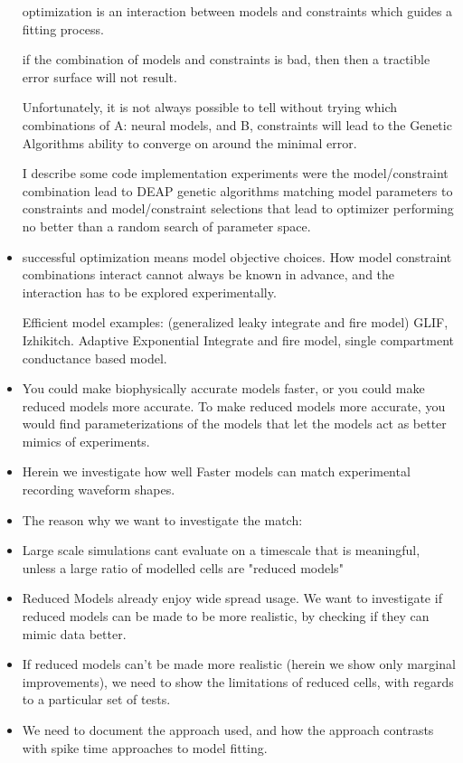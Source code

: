 \begin{itemize}
\newline


\subitem optimization is an interaction between models and constraints which guides a fitting process. 

\subitem if the combination of models and constraints is bad, then then a tractible error surface will not result.  

\subsubitem Unfortunately, it is not always possible to tell without trying which combinations of A: neural models, and B, constraints will lead to the Genetic Algorithms ability to converge on around the minimal error. 


I describe some code implementation experiments were the model/constraint combination lead to DEAP genetic algorithms matching model parameters to constraints and model/constraint selections that lead to optimizer performing no better than a random search of parameter space.


\item successful optimization means model objective choices. How model constraint combinations interact cannot always be known in advance, and the interaction has to be explored experimentally.

Efficient model examples: (generalized leaky integrate and fire model) GLIF, Izhikitch. Adaptive Exponential Integrate and fire model, single compartment conductance based model. 

\item You could make biophysically accurate models faster, or you could make reduced models more accurate. To make reduced models more accurate, you would find parameterizations of the models that let the models act as better mimics of experiments.
\item Herein we investigate how well Faster models can match experimental recording waveform shapes.
\item The reason why we want to investigate the match:
\item Large scale simulations cant evaluate on a timescale that is meaningful, unless a large ratio of modelled cells are "reduced models"
\item Reduced Models already enjoy wide spread usage. We want to investigate if reduced models can be made to be more realistic, by checking if they can mimic data better.
\item If reduced models can't be made more realistic (herein we show only marginal improvements), we need to show the limitations of reduced cells, with regards to a particular set of tests.
\item We need to document the approach used, and how the approach contrasts with spike time approaches to model fitting.
\end{itemize}